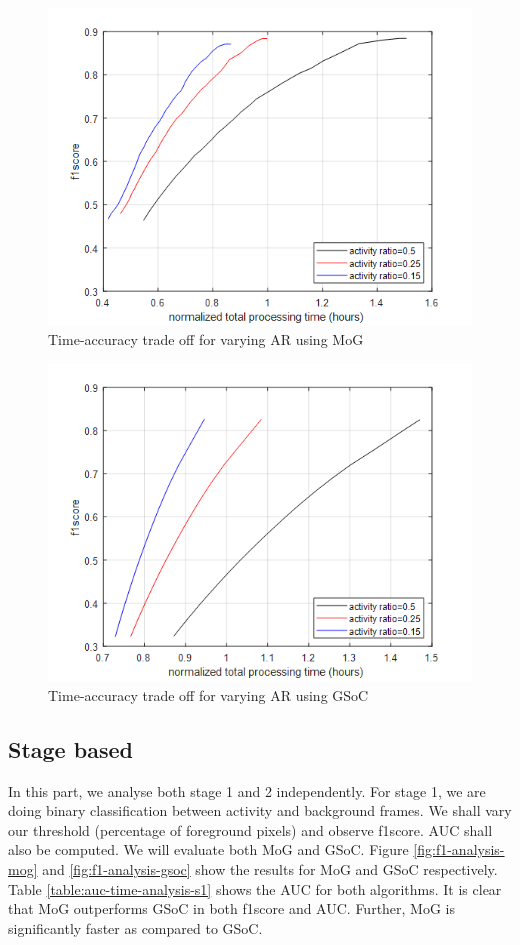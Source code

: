\begin{figure}
    \centering
    \includegraphics[width=\linewidth]{images/time-acc-tradeoff-ar-mog.png}
    \caption{Time-accuracy trade off for varying AR using MoG}
    \label{fig:time-acc-tradeoff-ar-mog}
\end{figure}

\begin{figure}
    \centering
    \includegraphics[width=\linewidth]{images/time-acc-tradeoff-ar-gsoc.png}
    \caption{Time-accuracy trade off for varying AR using GSoC}
    \label{fig:time-acc-tradeoff-ar-gsoc}
\end{figure}


\subsection{Stage based }
In this part, we analyse both stage 1 and 2 independently. For stage 1, we are doing binary classification between activity and background frames. We shall vary our threshold (percentage of foreground pixels) and observe f1score. AUC shall also be computed. We will evaluate both MoG and GSoC. Figure \ref{fig:f1-analysis-mog} and \ref{fig:f1-analysis-gsoc} show the results for MoG and GSoC respectively. Table \ref{table:auc-time-analysis-s1} shows the AUC for both algorithms. It is clear that MoG outperforms GSoC in both f1score and AUC. Further, MoG is significantly faster as compared to GSoC.   

